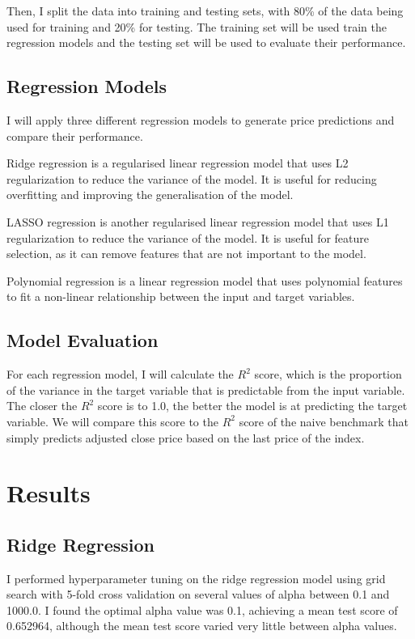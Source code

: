 \documentclass[a4paper, 11pt]{article}
\begin{document}
Then, I split the data into training and testing sets, with 80\% of the data being used for training and 20\% for testing. The training set will be used train the regression models and the testing set will be used to evaluate their performance.

\subsection{Regression Models}
I will apply three different regression models to generate price predictions and compare their performance.

Ridge regression is a regularised linear regression model that uses L2 regularization to reduce the variance of the model. It is useful for reducing overfitting and improving the generalisation of the model.

LASSO regression is another regularised linear regression model that uses L1 regularization to reduce the variance of the model. It is useful for feature selection, as it can remove features that are not important to the model.

Polynomial regression is a linear regression model that uses polynomial features to fit a non-linear relationship between the input and target variables.

\subsection{Model Evaluation}
For each regression model, I will calculate the $R^2$ score, which is the proportion of the variance in the target variable that is predictable from the input variable. The closer the $R^2$ score is to 1.0, the better the model is at predicting the target variable. We will compare this score to the $R^2$ score of the naive benchmark that simply predicts adjusted close price based on the last price of the index.

\section{Results}
\subsection{Ridge Regression}
I performed hyperparameter tuning on the ridge regression model using grid search with 5-fold cross validation on several values of alpha between 0.1 and 1000.0. I found the optimal alpha value was 0.1, achieving a mean test score of 0.652964, although the mean test score varied very little between alpha values.
\end{document}
